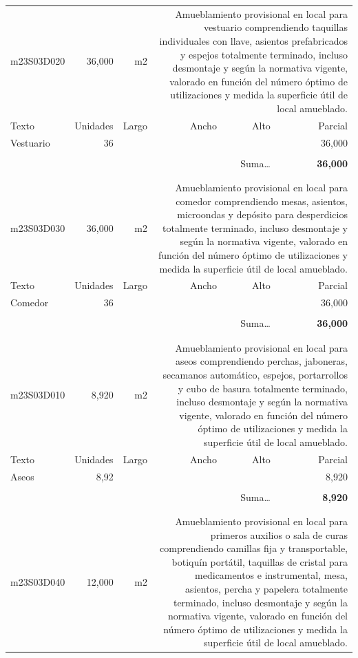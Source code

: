\documentclass{book}%
\begin{document}
\begin{longtable}{lrrrrr}
m23S03D020&    36,000& m2&\multicolumn{3}{p{6cm}}{\scriptsize Amueblamiento provisional en local para vestuario comprendiendo taquillas individuales con llave, asientos prefabricados y espejos totalmente terminado, incluso desmontaje y según la normativa vigente, valorado en función del número óptimo de utilizaciones y medida la superficie útil de local amueblado.\normalsize}\\%
Texto&Unidades&Largo&Ancho&Alto&Parcial\\%
\hline%
\multicolumn{1}{p{3.5cm}}{Vestuario}&36&&&&    36,000\\%
&&&&&\\%
\multicolumn{5}{r}{Suma\ldots}&\textbf{    36,000}\\%
\hline%
&&&&&\\%
&&&&&\\%
m23S03D030&    36,000& m2&\multicolumn{3}{p{6cm}}{\scriptsize Amueblamiento provisional en local para comedor comprendiendo mesas, asientos, microondas y depósito para desperdicios totalmente terminado, incluso desmontaje y según la normativa vigente, valorado en función del número óptimo de utilizaciones y medida la superficie útil de local amueblado.\normalsize}\\%
Texto&Unidades&Largo&Ancho&Alto&Parcial\\%
\hline%
\multicolumn{1}{p{3.5cm}}{Comedor}&36&&&&    36,000\\%
&&&&&\\%
\multicolumn{5}{r}{Suma\ldots}&\textbf{    36,000}\\%
\hline%
&&&&&\\%
&&&&&\\%
m23S03D010&     8,920& m2&\multicolumn{3}{p{6cm}}{\scriptsize Amueblamiento provisional en local para aseos comprendiendo perchas, jaboneras, secamanos automático, espejos, portarrollos y cubo de basura totalmente terminado, incluso desmontaje y según la normativa vigente, valorado en función del número óptimo de utilizaciones y medida la superficie útil de local amueblado.\normalsize}\\%
Texto&Unidades&Largo&Ancho&Alto&Parcial\\%
\hline%
\multicolumn{1}{p{3.5cm}}{Aseos}&8,92&&&&     8,920\\%
&&&&&\\%
\multicolumn{5}{r}{Suma\ldots}&\textbf{     8,920}\\%
\hline%
&&&&&\\%
&&&&&\\%
m23S03D040&    12,000& m2&\multicolumn{3}{p{6cm}}{\scriptsize Amueblamiento provisional en local para primeros auxilios o sala de curas comprendiendo camillas fija y transportable, botiquín portátil, taquillas de cristal para medicamentos e instrumental, mesa, asientos, percha y papelera totalmente terminado, incluso desmontaje y según la normativa vigente, valorado en función del número óptimo de utilizaciones y medida la superficie útil de local amueblado.\normalsize}\\%

\end{longtable}
\end{document}
